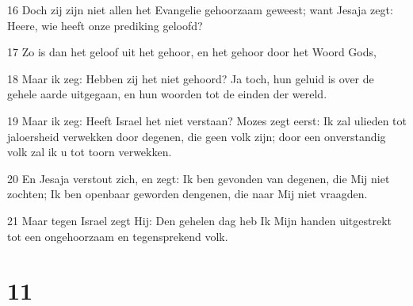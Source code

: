 \par 16 Doch zij zijn niet allen het Evangelie gehoorzaam geweest; want Jesaja zegt: Heere, wie heeft onze prediking geloofd?
\par 17 Zo is dan het geloof uit het gehoor, en het gehoor door het Woord Gods,
\par 18 Maar ik zeg: Hebben zij het niet gehoord? Ja toch, hun geluid is over de gehele aarde uitgegaan, en hun woorden tot de einden der wereld.
\par 19 Maar ik zeg: Heeft Israel het niet verstaan? Mozes zegt eerst: Ik zal ulieden tot jaloersheid verwekken door degenen, die geen volk zijn; door een onverstandig volk zal ik u tot toorn verwekken.
\par 20 En Jesaja verstout zich, en zegt: Ik ben gevonden van degenen, die Mij niet zochten; Ik ben openbaar geworden dengenen, die naar Mij niet vraagden.
\par 21 Maar tegen Israel zegt Hij: Den gehelen dag heb Ik Mijn handen uitgestrekt tot een ongehoorzaam en tegensprekend volk.

\chapter{11}

